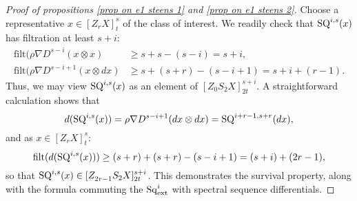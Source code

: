 \documentclass[11pt]{amsart} \renewcommand{\baselinestretch}{1.2}
\theoremstyle{plain}
\numberwithin{equation}{section} %
\theoremstyle{plain}
\numberwithin{equation}{chapter} %
\newcommand{\Nabla}{\nabla}
\newcommand{\Sq}{\mathrm{Sq}}
\newcommand{\E}[5]{[E^{#1}_{#2}#3]^{#4}_{#5}}
\newcommand{\EZdownup}[5]{[Z^{#2}_{#1}#3]^{#4}_{#5}}
\newcommand{\filt}{\mathrm{filt}}
\begin{document}
\begin{second quadrant homotopy sseq operations}
%
%
%
%
%


\begin{proof}[Proof of propositions \ref{prop on e1 steens 1} and \ref{prop on e1 steens 2}]
Choose a representative $x\in \EZdownup{r}{}{X}{s}{t}$ of the class of interest. We readily check that $\textup{SQ}^{i,s}(x)$ has filtration at least $s+i$:
\begin{align*}
\filt(\rho\Nabla D^{s-i}(x\otimes x)&\geq s+s-(s-i)=s+i,\\
\filt(\rho\Nabla D^{s-i+1}(x\otimes dx)&\geq s+(s+r)-(s-i+1)=s+i+(r-1).
\end{align*}
Thus, we may view $\textup{SQ}^{i,s}(x)$ as an element of $\EZdownup{0}{}{S_2X}{s+i}{2t}$. 
A straightforward calculation shows that \[d(\textup{SQ}^{i,s}(x))=\rho\Nabla D^{s-i+1}(dx\otimes dx)=\textup{SQ}^{i+r-1,s+r}(dx),\] and as $x\in \EZdownup{r}{}{X}{s}{t}$:
\[\filt(d(\textup{SQ}^{i,s}(x)))\geq (s+r)+(s+r)-(s-i+1)=(s+i)+(2r-1),\]
so that $\textup{SQ}^{i,s}(x)\in \EZdownup{2r-1}{}{S_2X}{s+i}{2t}$. This demonstrates the survival property, along with the formula commuting the $\Sq^i_\textup{ext}$ with spectral sequence differentials.


\end{proof}
\end{second quadrant homotopy sseq operations}
\end{document}
